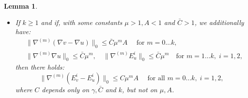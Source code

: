 \documentclass[reqno,twoside,11pt]{amsart}
\newcommand*{\dbar}[1]{\bar{\bar{#1}}}
\newcommand*{\tbar}[1]{\bar{\dbar{#1}}}
\numberwithin{equation}{section}
\theoremstyle{plain}
\newtheorem{lemma}[theorem]{Lemma}
\theoremstyle{definition}
\begin{document}
\begin{lemma}
\begin{itemize}
\begin{equation*}
\begin{split}
& \|\nabla^{(m)}(E^2_v-E^2_u)\|_0\\ & \leq C \hspace{-7mm}\sum_{p+\sum_{i=1}^mi(p_i+\bar
  p_i + \dbar p_i+\tbar p_i)=m\hspace{-10mm}} \hspace{-11mm} \|\nabla^{(p)}(\nabla v-\nabla u)\|_0
\prod_{i=1}^m \|\nabla^{(i)}(\nabla v - \nabla u)\|_0^{p_i} \|\nabla^{(i)}\nabla v\|_0^{\bar p_i}
\|\nabla^{(i)}E^1_u\|_0^{\dbar p_i} \|\nabla^{(i)}E^2_u\|_0^{\tbar p_i}.
\end{split}
\end{equation*}
\item[(iii)]  If $k\geq 1$ and if, with some constants $\mu>1, A<1$ and $\bar C>1$, we additionally have:
\begin{equation*}
\begin{split}
& \|\nabla^{(m)}(\nabla v-\nabla u)\|_0\leq \bar C \mu^mA \quad\mbox{ for } m=0\ldots k,
\\ & \|\nabla^{(m)}\nabla u\|_0\leq \bar C\mu^{m}, ~~ \;\;
\|\nabla^{(m)}E^i_u\|_0\leq \bar C\mu^{m}  \quad\mbox{for } m=1\ldots k,\; i=1,2,
\end{split}
\end{equation*}
then there holds:
$$\|\nabla^{(m)}(E^i_v-E^i_u)\|_0\leq C \mu^mA \quad\mbox{ for all }
m=0\ldots k,\; i=1,2,$$
where $C$ depends only on $\gamma, \bar C$ and $k$, but not on $\mu, A$.
\end{itemize}
\end{lemma}
\end{document}
